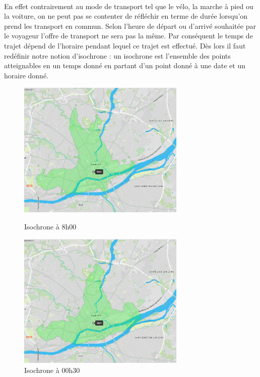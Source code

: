 \documentclass[a4paper]{report}
\begin{document}
\paragraph{}En effet contrairement au mode de transport tel que le vélo, la marche à pied ou la voiture, on ne peut pas se contenter de réfléchir en terme de durée lorsqu'on prend les transport en commun. Selon l'heure de départ ou d'arrivé souhaitée par le voyageur l'offre de transport ne sera pas la même. Par conséquent le temps de trajet dépend de l'horaire pendant lequel ce trajet est effectué. Dès lors il faut redéfinir notre notion d'isochrone : un isochrone est l'ensemble des points atteignables en un temps donné en partant d'un point donné à une date et un horaire donné.

\begin{figure}[H]
	\begin{minipage}[c]{.46\linewidth}
		\includegraphics[width=8cm]{image/iso_8h}
       		\caption{Isochrone à 8h00}
		\label{Isochrone à 8h00}
	\end{minipage} \hfill
	\begin{minipage}[c]{.46\linewidth}
		\includegraphics[width=8cm]{image/iso_00h30}
       		\caption{Isochrone à 00h30}
		\label{Isochrone à 00h30}
	\end{minipage}
\end{figure}
\end{document}
